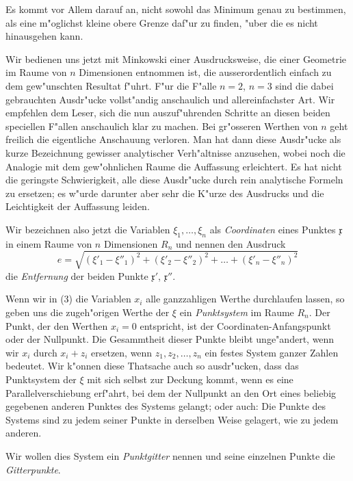 \documentclass[12pt,a4paper]{article}
\theoremstyle{definition}
\begin{document}
Es kommt vor Allem darauf an, nicht sowohl das Minimum genau zu bestimmen, als eine m"oglichst kleine obere Grenze daf"ur zu finden, "uber die es nicht hinausgehen kann.

Wir bedienen uns jetzt mit Minkowski einer Ausdrucksweise, die einer Geometrie im Raume von $n$ Dimensionen entnommen ist, die ausserordentlich einfach zu dem gew"unschten Resultat f"uhrt. F"ur die F"alle $n = 2$, $n = 3$ sind die dabei gebrauchten Ausdr"ucke vollst"andig anschaulich und allereinfachster Art. Wir empfehlen dem Leser, sich die nun auszuf"uhrenden Schritte an diesen beiden speciellen F"allen anschaulich klar zu machen. Bei gr"osseren Werthen von $n$ geht freilich die eigentliche Anschauung verloren. Man hat dann diese Ausdr"ucke als kurze Bezeichnung gewisser analytischer Verh"altnisse anzusehen, wobei noch die Analogie mit dem gew"ohnlichen Raume die Auffassung erleichtert. Es hat nicht die geringste Schwierigkeit, alle diese Ausdr"ucke durch rein analytische Formeln zu ersetzen; es w"urde darunter aber sehr die K"urze des Ausdrucks und die Leichtigkeit der Auffassung leiden.

Wir bezeichnen also jetzt die Variablen $\xi_1, \dots, \xi_n$ als \emph{Coordinaten} eines Punktes $\mathfrak{x}$ in einem Raume von $n$ Dimensionen $R_n$ und nennen den Ausdruck
\begin{equation}
e = \sqrt{(\xi'_1 - \xi''_1)^2 + (\xi'_2 - \xi''_2)^2 + \dots + (\xi'_n - \xi''_n)^2}
\end{equation}
die \emph{Entfernung} der beiden Punkte $\mathfrak{x}'$, $\mathfrak{x}''$.

Wenn wir in (3) die Variablen $x_i$ alle ganzzahligen Werthe durchlaufen lassen, so geben uns die zugeh"origen Werthe der $\xi$ ein \emph{Punktsystem} im Raume $R_n$. Der Punkt, der den Werthen $x_i = 0$ entspricht, ist der Coordinaten-Anfangspunkt oder der Nullpunkt. Die Gesammtheit dieser Punkte bleibt unge"andert, wenn wir $x_i$ durch $x_i + z_i$ ersetzen, wenn $z_1, z_2, \dots, z_n$ ein festes System ganzer Zahlen bedeutet. Wir k"onnen diese Thatsache auch so ausdr"ucken, dass das Punktsystem der $\xi$ mit sich selbst zur Deckung kommt, wenn es eine Parallelverschiebung erf"ahrt, bei dem der Nullpunkt an den Ort eines beliebig gegebenen anderen Punktes des Systems gelangt; oder auch: Die Punkte des Systems sind zu jedem seiner Punkte in derselben Weise gelagert, wie zu jedem anderen.

Wir wollen dies System ein \emph{Punktgitter} nennen und seine einzelnen Punkte die \emph{Gitterpunkte}.
\end{document}
